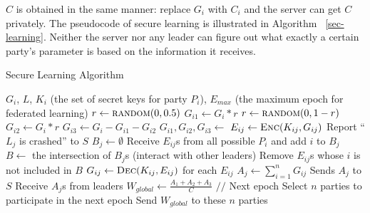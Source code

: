 $C$ is obtained in the same manner: replace $G_i$ with $C_i$ and the server can get $C$ privately. The pseudocode of secure learning is illustrated in Algorithm ~\ref{sec-learning}. Neither the server nor any leader can figure out what exactly a certain party's parameter is based on the information it receives. 


\begin{algorithm}
    \label{sec-learning}
    \caption{Secure Learning Algorithm}
    \begin{algorithmic}[1] 
        \Require $G_i$, $L$, $K_i$ (the set of secret keys for party $P_i$), $E_{max}$ (the maximum epoch for federated learning)
            \State $r \gets \Call{random}{0, 0.5}$
            \State $G_{i1} \gets G_i * r$
            \State $r \gets \Call{random}{0, 1-r}$
            \State $G_{i2} \gets G_i * r$
            \State $G_{i3} \gets G_i - G_{i1} - G_{i2}$
            \State {}
        \EndFunction
        \State
            \State $G_{i1}, G_{i2}, G_{i3} \gets$ 
                \State $E_{ij} \gets \Call{Enc}{K_{ij}, G_{ij}}$
                    \State Report ``$L_j$ is crashed'' to $S$
                \EndIf
            \EndFor
        \EndFunction
        \State
            \State $B_j \gets \emptyset$
            \State Receive $E_{ij}$s from all possible $P_i$ and add $i$ to $B_j$
            \State $B \gets$ the intersection of $B_j$s (interact with other leaders)
            \State Remove $E_{ij}$s whose $i$ is not included in $B$
            \State $G_{ij} \gets \Call{Dec}{K_{ij}, E_{ij}}$ for each $E_{ij}$
            \State $A_j \gets \sum_{i=1}^nG_{ij}$
            \State Sends $A_j$ to $S$
        \EndFunction
        \State
                \State {}
            \EndIf
            \State Receive $A_j$s from leaders
            \State $W_{global} \gets \frac{A_1 + A_2 + A_3}{C} $
            \State {} 
            \State $//$ Next epoch
            \State Select $n$ parties to participate in the next epoch
            \State Send $W_{global}$ to these $n$ parties
            \State {}
        \EndFunction
    \end{algorithmic}
\end{algorithm}


